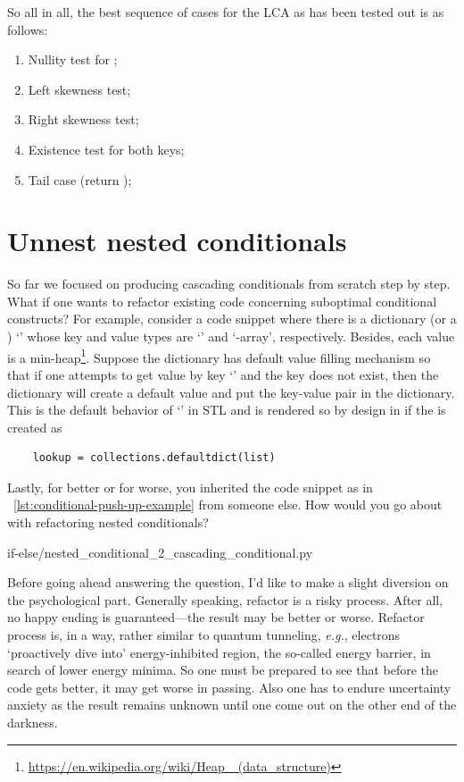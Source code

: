 So all in all, the best sequence of cases for the LCA as has been tested out is as follows:
\begin{enumerate}
    \item Nullity test for ;
    \item Left skewness test;
    \item Right skewness test;
    \item Existence test for both keys;
    \item Tail case (return );
\end{enumerate}

\section{Unnest nested conditionals}\label{sec:unnestnestedconditionals}

So far we focused on producing cascading conditionals from scratch step by step.
What if one wants to refactor existing code concerning suboptimal conditional constructs?
For example, consider a code snippet where there
is a dictionary (or a ) `' whose key and value types are
`' and `-array', respectively.
Besides, each value is a min-heap\footnote{\url{https://en.wikipedia.org/wiki/Heap_
(data_structure)}}.
Suppose the dictionary  has default value filling mechanism so that
if one attempts to get value by key `' and the key does not exist, then the
dictionary will create a default value and put the key-value pair in the dictionary.
This is the default behavior of `' in \cpp STL and
is rendered so by design in \python if the  is created as
\begin{lstlisting}
    lookup = collections.defaultdict(list)
\end{lstlisting}
Lastly, for better or for worse, you inherited the code snippet
as in ~\autoref{lst:conditional-push-up-example} from someone else.
How would you go about with refactoring nested conditionals?
\begin{clisting}[htb]
    
    {if-else/nested_conditional_2_cascading_conditional.py}
\end{clisting}


Before going ahead answering the question, I'd like to make a slight diversion on the
psychological part.
Generally speaking, refactor is a risky process.
After all, no happy ending is guaranteed---the result may be better or worse.
Refactor process is, in a way, rather similar to quantum tunneling, \textit{e.g.}, electrons
`proactively dive into' energy-inhibited region, the so-called energy barrier,
in search of lower energy minima.
So one must be prepared to see that before the code gets better, it may get worse in passing.
Also one has to endure uncertainty anxiety as the result remains unknown until one come out on
the other end of the darkness.


